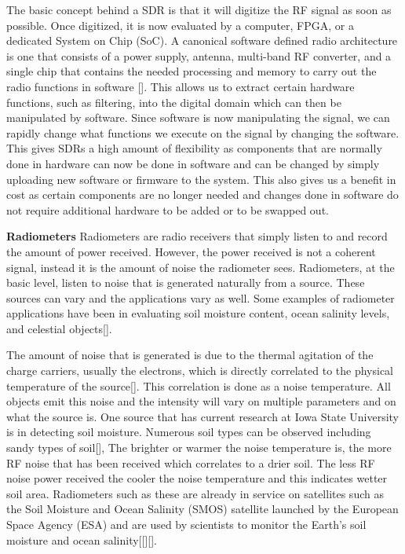 The basic concept behind a SDR is that it will digitize the RF signal as soon as possible.  Once digitized, it is now evaluated by a computer, FPGA, or a dedicated System on Chip (SoC).  A canonical software defined radio architecture is one that consists of a power supply, antenna, multi-band RF converter, and a single chip that contains the needed processing and memory to carry out the radio functions in software [\cite{Mitola1995}]. This allows us to extract certain hardware functions, such as filtering, into the digital domain which can then be manipulated by software.  Since software is now manipulating the signal, we can rapidly change what functions we execute on the signal by changing the software.  This gives SDRs a high amount of flexibility as components that are normally done in hardware can now be done in software and can be changed by simply uploading new software or firmware to the system.  This also gives us a benefit in cost as certain components are no longer needed and changes done in software do not require additional hardware to be added or to be swapped out.

\textbf{Radiometers}  
Radiometers are radio receivers that simply listen to and record the amount of power received.  However, the power received is not a coherent signal, instead it is the amount of noise the radiometer sees.  Radiometers, at the basic level, listen to noise that is generated naturally from a source.  These sources can vary and the applications vary as well.  Some examples of radiometer applications have been in evaluating soil moisture content, ocean salinity levels, and celestial objects[\cite{ulaby2014}].

The amount of noise that is generated is due to the thermal agitation of the charge carriers, usually the electrons, which is directly correlated to the physical temperature of the source[\cite{Nyquist1928thermal}].  This correlation is done as a noise temperature.  All objects emit this noise and the intensity will vary on multiple parameters and on what the source is.  One source that has current research at Iowa State University is in detecting soil moisture.  Numerous soil types can be observed including sandy types of soil[\cite{Liu}], The brighter or warmer the noise temperature is, the more RF noise that has been received which correlates to a drier soil.  The less RF noise power received the cooler the noise temperature and this indicates wetter soil area. Radiometers such as these are already in service on satellites such as the Soil Moisture and Ocean Salinity (SMOS) satellite launched by the European Space Agency (ESA) and are used by scientists to monitor the Earth's soil moisture and ocean salinity[[\cite{McMullan}][\cite{Hardy}].  

